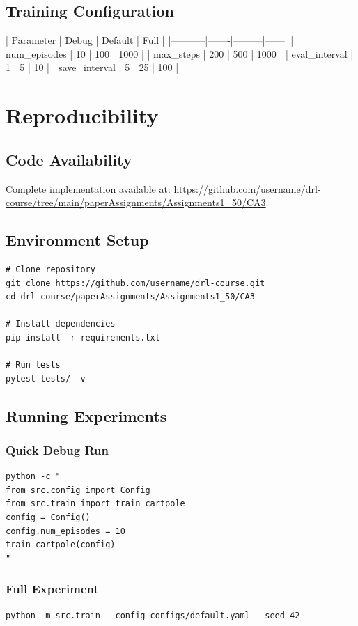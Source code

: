 \documentclass{article}
\begin{document}
\subsection{Training Configuration}

| Parameter | Debug | Default | Full |
|-----------|-------|---------|------|
| num_episodes | 10 | 100 | 1000 |
| max_steps | 200 | 500 | 1000 |
| eval_interval | 1 | 5 | 10 |
| save_interval | 5 | 25 | 100 |

\section{Reproducibility}

\subsection{Code Availability}

Complete implementation available at:
\url{https://github.com/username/drl-course/tree/main/paperAssignments/Assignments1_50/CA3}

\subsection{Environment Setup}

\begin{verbatim}
# Clone repository
git clone https://github.com/username/drl-course.git
cd drl-course/paperAssignments/Assignments1_50/CA3

# Install dependencies
pip install -r requirements.txt

# Run tests
pytest tests/ -v
\end{verbatim}

\subsection{Running Experiments}

\subsubsection{Quick Debug Run}
\begin{verbatim}
python -c "
from src.config import Config
from src.train import train_cartpole
config = Config()
config.num_episodes = 10
train_cartpole(config)
"
\end{verbatim}

\subsubsection{Full Experiment}
\begin{verbatim}
python -m src.train --config configs/default.yaml --seed 42
\end{verbatim}
\end{document}
